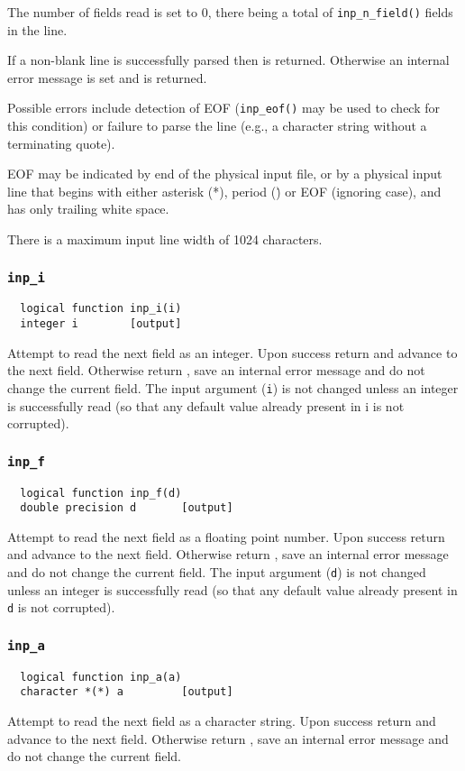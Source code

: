 The number of fields read is set to 0, there being a total of
\verb+inp_n_field()+ fields in the line.

If a non-blank line is successfully parsed then \TRUE is returned.
Otherwise an internal error message is set and \FALSE is returned.

Possible errors include detection of EOF ({\tt inp\_eof()} may be used to
check for this condition) or failure to parse the line (e.g., a
character string without a terminating quote).

EOF may be indicated by end of the physical input file, or by a
physical input line that begins with either asterisk (*), period (\.)
or EOF (ignoring case), and has only trailing white space.

There is a maximum input line width of 1024 characters.

\subsubsection{{\tt inp\_i}}
\begin{verbatim}
  logical function inp_i(i)
  integer i        [output]
\end{verbatim}
Attempt to read the next field as an integer.  Upon success return
\TRUE and advance to the next field.  Otherwise return \FALSE,
save an internal error message and do not change the
current field.  The input argument ({\tt i}) is not changed unless an
integer is successfully read (so that any default value already
present in i is not corrupted).

\subsubsection{{\tt inp\_f}}
\begin{verbatim}
  logical function inp_f(d)
  double precision d       [output]
\end{verbatim}
Attempt to read the next field as a floating point number.  Upon
success return \TRUE and advance to the next field.  Otherwise
return \FALSE, save an internal error message and do not change
the current field.  The input argument ({\tt d}) is not changed unless
an integer is successfully read (so that any default value already
present in {\tt d} is not corrupted).

\subsubsection{{\tt inp\_a}}
\begin{verbatim}
  logical function inp_a(a)
  character *(*) a         [output]
\end{verbatim}
Attempt to read the next field as a character string.  Upon success
return \TRUE and advance to the next field.  Otherwise return
\FALSE, save an internal error message and do not change the
current field.

